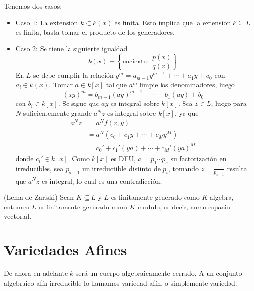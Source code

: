 \documentclass{article}
\begin{document}
\noindent Tenemos dos casos:
\begin{itemize}
    \item Caso $1$: La extensión $k\subset k(x)$ es finita. Esto implica que la extensión 
    $k\subseteq L$ es finita, basta tomar el producto de los generadores.

    \item Caso $2$: Se tiene la siguiente igualdad
    \begin{equation*}
        k(x)=\left\{\text{cocientes }\frac{p(x)}{q(x)}\right\}
    \end{equation*}
    En $L$ se debe cumplir la relación $y^{m}=a_{m-1}y^{m-1}+\cdots+a_{1}y+a_{0}$ con 
    $a_{i}\in k(x)$. Tomar $a\in k[x]$ tal que $a^{m}$ limpie los denominadores, luego
    \begin{equation*}
        (ay)^{m}=b_{m-1}(ay)^{m-1}+\cdots+b_{1}(ay)+b_{0}
    \end{equation*}
    con $b_{i}\in k[x]$. Se sigue que $ay$ es integral sobre $k[x]$. Sea $z\in L$, luego para $N$ 
    suficientemente grande $a^{N}z$ es integral sobre $k[x]$, ya que
    \begin{align*}
        a^{N}z &= a^{N}f(x,y) \\
        &= a^{N}(c_{0}+c_{1}y+\cdots+c_{M}y^{M}) \\
        &= c_{0}'+c_{1}'(ya)+\cdots+c_{M}'(ya)^{M}
    \end{align*}
    donde $c_{i}'\in k[x]$. Como $k[x]$ es DFU, $a=p_{1}\cdots p_{s}$ su factorización en 
    irreducibles, sea $p_{s+1}$ un irreductible distinto de $p_{i}$, tomando $z=\frac{1}{p_{s+1}}$ 
    resulta que $a^{N}z$ es integral, lo cual es una contradicción.
\end{itemize}

\begin{lema}
    (Lema de Zariski) Sean $K\subseteq L$ y $L$ es finitamente generado como $K$ algebra, entonces
    $L$ es finitamente generado como $K$ modulo, es decir, como espacio vectorial.
\end{lema}

\newpage
\section{Variedades Afines}
\noindent De ahora en adelante $k$ será un cuerpo algebraicamente cerrado. A un conjunto algebraico
afín irreducible lo llamamos variedad afín, o simplemente variedad.
\end{document}
